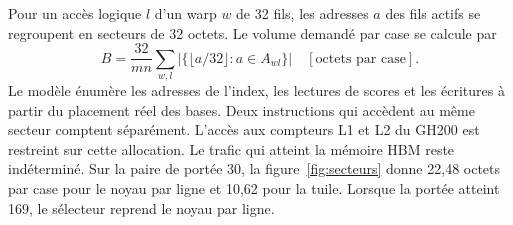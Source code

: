 Pour un accès logique \(l\) d'un warp \(w\) de 32 fils, les adresses \(a\) des fils actifs se regroupent en secteurs de 32 octets. Le volume demandé par case se calcule par
\[
 B=\frac{32}{mn}\sum_{w,l}\bigl|\{\lfloor a/32\rfloor : a\in A_{wl}\}\bigr|
 \quad [\text{octets par case}].
\]
Le modèle énumère les adresses de l'index, les lectures de scores et les écritures à partir du placement réel des bases. Deux instructions qui accèdent au même secteur comptent séparément. L'accès aux compteurs L1 et L2 du GH200 est restreint sur cette allocation. Le trafic qui atteint la mémoire HBM reste indéterminé.
Sur la paire de portée 30, la figure~\ref{fig:secteurs} donne 22,48 octets par case pour le noyau par ligne et 10,62 pour la tuile. Lorsque la portée atteint 169, le sélecteur reprend le noyau par ligne.
